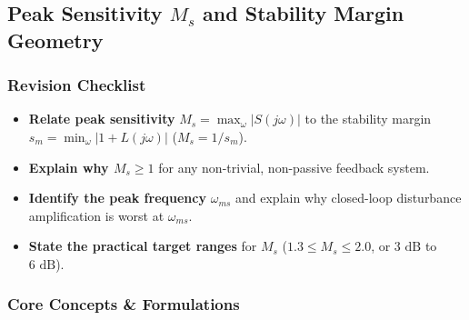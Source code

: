 \documentclass[12pt,onecolumn,twoside ]{article}
\begin{document}
	\subsection{Peak Sensitivity $M_s$ and Stability Margin Geometry}
	\subsubsection{Revision Checklist}
	\begin{itemize}
		\item[$\square$]
		\textbf{Relate peak sensitivity} $M_s = \max_\omega |S(j\omega)|$ to the stability margin $s_m = \min_\omega |1 + L(j\omega)|$ ($M_s = 1/s_m$).
		\item[$\square$]
		\textbf{Explain why $M_s \ge 1$} for any non-trivial, non-passive feedback system.
		\item[$\square$]
		\textbf{Identify the peak frequency} $\omega_{ms}$ and explain why closed-loop disturbance amplification is worst at $\omega_{ms}$.
		\item[$\square$]
		\textbf{State the practical target ranges} for $M_s$ ($1.3 \le M_s \le 2.0$, or $3\text{ dB}$ to $6\text{ dB}$).
	\end{itemize}
	
	\subsubsection{Core Concepts \& Formulations}
\end{document}
